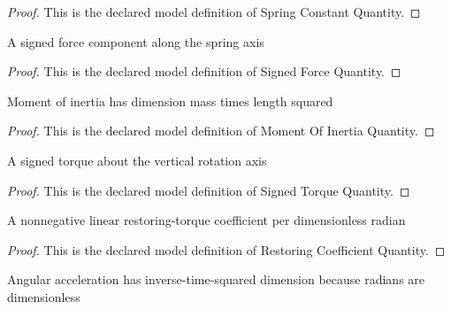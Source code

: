 \begin{proof}
  This is the declared model definition of Spring Constant Quantity.
\end{proof}
\begin{definition}
  \label{def:physics:phyx-mini-0268:phyxminiproblems-problemphyxmini0268-signedforcequantity}
  A signed force component along the spring axis
\end{definition}
\begin{proof}
  This is the declared model definition of Signed Force Quantity.
\end{proof}
\begin{definition}
  \label{def:physics:phyx-mini-0268:phyxminiproblems-problemphyxmini0268-momentofinertiaquantity}
  Moment of inertia has dimension mass times length squared
\end{definition}
\begin{proof}
  This is the declared model definition of Moment Of Inertia Quantity.
\end{proof}
\begin{definition}
  \label{def:physics:phyx-mini-0268:phyxminiproblems-problemphyxmini0268-signedtorquequantity}
  A signed torque about the vertical rotation axis
\end{definition}
\begin{proof}
  This is the declared model definition of Signed Torque Quantity.
\end{proof}
\begin{definition}
  \label{def:physics:phyx-mini-0268:phyxminiproblems-problemphyxmini0268-restoringcoefficientquantity}
  A nonnegative linear restoring-torque coefficient per dimensionless radian
\end{definition}
\begin{proof}
  This is the declared model definition of Restoring Coefficient Quantity.
\end{proof}
\begin{definition}
  \label{def:physics:phyx-mini-0268:phyxminiproblems-problemphyxmini0268-angularaccelerationquantity}
  Angular acceleration has inverse-time-squared dimension because radians are dimensionless
\end{definition}
